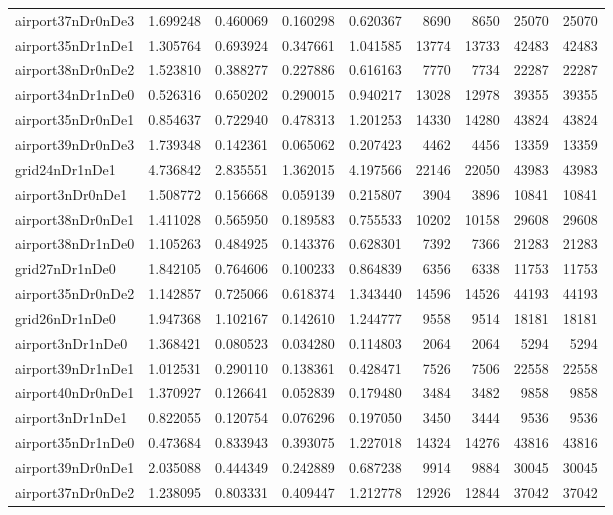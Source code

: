 \begin{longtable}{|l|r|r|r|r|r|r|r|r|}
airport37nDr0nDe3 & 1.699248 & 0.460069 & 0.160298 & 0.620367 & 8690 & 8650 & 25070 & 25070 \\
airport35nDr1nDe1 & 1.305764 & 0.693924 & 0.347661 & 1.041585 & 13774 & 13733 & 42483 & 42483 \\
airport38nDr0nDe2 & 1.523810 & 0.388277 & 0.227886 & 0.616163 & 7770 & 7734 & 22287 & 22287 \\
airport34nDr1nDe0 & 0.526316 & 0.650202 & 0.290015 & 0.940217 & 13028 & 12978 & 39355 & 39355 \\
airport35nDr0nDe1 & 0.854637 & 0.722940 & 0.478313 & 1.201253 & 14330 & 14280 & 43824 & 43824 \\
airport39nDr0nDe3 & 1.739348 & 0.142361 & 0.065062 & 0.207423 & 4462 & 4456 & 13359 & 13359 \\
grid24nDr1nDe1 & 4.736842 & 2.835551 & 1.362015 & 4.197566 & 22146 & 22050 & 43983 & 43983 \\
airport3nDr0nDe1 & 1.508772 & 0.156668 & 0.059139 & 0.215807 & 3904 & 3896 & 10841 & 10841 \\
airport38nDr0nDe1 & 1.411028 & 0.565950 & 0.189583 & 0.755533 & 10202 & 10158 & 29608 & 29608 \\
airport38nDr1nDe0 & 1.105263 & 0.484925 & 0.143376 & 0.628301 & 7392 & 7366 & 21283 & 21283 \\
grid27nDr1nDe0 & 1.842105 & 0.764606 & 0.100233 & 0.864839 & 6356 & 6338 & 11753 & 11753 \\
airport35nDr0nDe2 & 1.142857 & 0.725066 & 0.618374 & 1.343440 & 14596 & 14526 & 44193 & 44193 \\
grid26nDr1nDe0 & 1.947368 & 1.102167 & 0.142610 & 1.244777 & 9558 & 9514 & 18181 & 18181 \\
airport3nDr1nDe0 & 1.368421 & 0.080523 & 0.034280 & 0.114803 & 2064 & 2064 & 5294 & 5294 \\
airport39nDr1nDe1 & 1.012531 & 0.290110 & 0.138361 & 0.428471 & 7526 & 7506 & 22558 & 22558 \\
airport40nDr0nDe1 & 1.370927 & 0.126641 & 0.052839 & 0.179480 & 3484 & 3482 & 9858 & 9858 \\
airport3nDr1nDe1 & 0.822055 & 0.120754 & 0.076296 & 0.197050 & 3450 & 3444 & 9536 & 9536 \\
airport35nDr1nDe0 & 0.473684 & 0.833943 & 0.393075 & 1.227018 & 14324 & 14276 & 43816 & 43816 \\
airport39nDr0nDe1 & 2.035088 & 0.444349 & 0.242889 & 0.687238 & 9914 & 9884 & 30045 & 30045 \\
airport37nDr0nDe2 & 1.238095 & 0.803331 & 0.409447 & 1.212778 & 12926 & 12844 & 37042 & 37042 \\

\end{longtable}
